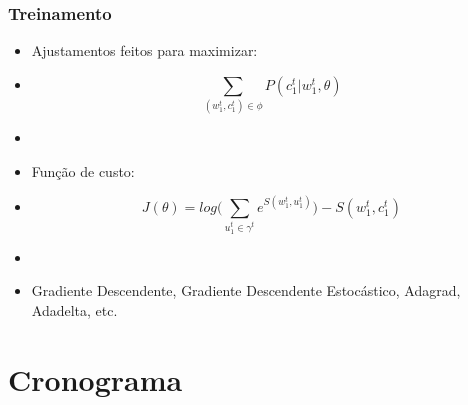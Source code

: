 \documentclass[10pt]{beamer}
\begin{document}
\begin{frame}[fragile]
\frametitle{Treinamento}
  
  \begin{itemize}

    \item[-] Ajustamentos feitos para maximizar:

    \item[\ ] \begin{equation}
    \sum\limits_{(w_1^t,c_1^t) \in \phi} P(c_1^t|w_1^t,\theta) \nonumber
    \end{equation}

    \item[\ ] \ 

    \item[-] Função de custo:

    \item[\ ] \begin{equation}
    J(\theta) = log\Bigg(\sum\limits_{u_1^t \in \gamma^t} e^{S(w_1^t, u_1^t)} \Bigg) - S(w_1^t, c_1^t) \nonumber
    \end{equation}

    \item[\ ] \ 

    \item[-] Gradiente Descendente, Gradiente Descendente Estocástico, Adagrad, Adadelta, etc. \cite{Bengio-et-al-2015-Book}

  \end{itemize}


\end{frame}





\section{Cronograma}
\end{document}
